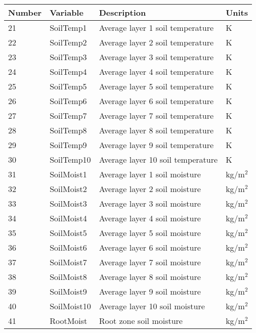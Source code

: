 \begin{tabular}{|l|l|l|l|} \hline
Number & Variable & Description                     & Units         \\ \hline
21 & SoilTemp1    & Average layer 1 soil temperature  & K             \\ \hline
22 & SoilTemp2    & Average layer 2 soil temperature  & K             \\ \hline
23 & SoilTemp3    & Average layer 3 soil temperature  & K             \\ \hline
24 & SoilTemp4    & Average layer 4 soil temperature  & K             \\ \hline
25 & SoilTemp5    & Average layer 5 soil temperature  & K             \\ \hline
26 & SoilTemp6    & Average layer 6 soil temperature  & K             \\ \hline
27 & SoilTemp7    & Average layer 7 soil temperature  & K             \\ \hline
28 & SoilTemp8    & Average layer 8 soil temperature  & K             \\ \hline
29 & SoilTemp9    & Average layer 9 soil temperature  & K             \\ \hline
30 & SoilTemp10   & Average layer 10 soil temperature & K             \\ \hline
31 & SoilMoist1   & Average layer 1 soil moisture   & kg/m$^2$      \\ \hline
32 & SoilMoist2   & Average layer 2 soil moisture   & kg/m$^2$      \\ \hline
33 & SoilMoist3   & Average layer 3 soil moisture   & kg/m$^2$      \\ \hline
34 & SoilMoist4   & Average layer 4 soil moisture   & kg/m$^2$      \\ \hline
35 & SoilMoist5   & Average layer 5 soil moisture   & kg/m$^2$      \\ \hline
36 & SoilMoist6   & Average layer 6 soil moisture  & kg/m$^2$      \\ \hline
37 & SoilMoist7   & Average layer 7 soil moisture  & kg/m$^2$      \\ \hline
38 & SoilMoist8   & Average layer 8 soil moisture  & kg/m$^2$      \\ \hline
39 & SoilMoist9   & Average layer 9 soil moisture  & kg/m$^2$      \\ \hline
40 & SoilMoist10  & Average layer 10 soil moisture & kg/m$^2$      \\ \hline
41 & RootMoist    & Root zone soil moisture        & kg/m$^2$      \\ \hline

\end{tabular}
